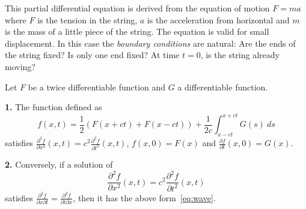 This partial differential equation is derived from the equation of motion \(F = m a\) where \(F\) is the tension in the string, \(a\) is the acceleration from horizontal and \(m\) is the mass of a little piece of the string.
The equation is valid for small displacement.
In this case the \emph{boundary conditions} are natural: Are the ends of the string fixed? Is only one end fixed? At time \(t=0\), is the string already moving?

\begin{theorem}
    Let \(F\) be a twice differentiable function and \(G\) a differentiable function.

    \noindent
    \textbf{1.} The function defined as
    \begin{equation}
        \label{eq:wave}
        f(x,t) = \frac{1}{2}(F(x+ct) + F(x-ct)) + \frac{1}{2c} \int_{x-ct}^{x+ct} G(s) \ ds
    \end{equation}
    satisfies \(   \frac{\partial^2 f}{\partial x^2}(x,t) = c^2  \frac{\partial^2 f}{\partial t^2}(x,t) \),
    \(f(x,0) = F(x)\)
    and \(\frac{\partial f}{\partial t}(x,0) = G(x)\).

    \noindent
    \textbf{2.} Conversely, if a solution of
    \[
        \frac{\partial^2 f}{\partial x^2}(x,t) = c^2  \frac{\partial^2 f}{\partial t^2}(x,t)
    \]
    satisfies
    \(\frac{\partial^2 f}{\partial x \partial t} = \frac{\partial^2 f}{\partial t \partial x}\),
    then it has the above form~\eqref{eq:wave}.
\end{theorem}


